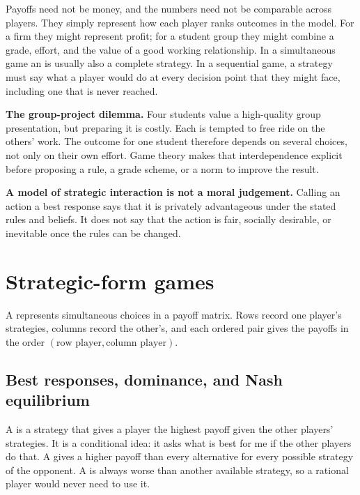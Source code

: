 Payoffs need not be money, and the numbers need not be comparable across
players. They simply represent how each player ranks outcomes in the model.
For a firm they might represent profit; for a student group they might combine
a grade, effort, and the value of a good working relationship.
In a simultaneous game an  is usually also a complete strategy.
In a sequential game, a strategy must say what a player would do at every
decision point that they might face, including one that is never reached.

\begin{exercisebox}
\textbf{The group-project dilemma.}
Four students value a high-quality group presentation, but preparing it is
costly. Each is tempted to free ride on the others' work. The outcome for one
student therefore depends on several choices, not only on their own effort.
Game theory makes that interdependence explicit before proposing a rule, a
grade scheme, or a norm to improve the result.
\end{exercisebox}

\begin{keyidea}
\textbf{A model of strategic interaction is not a moral judgement.}
Calling an action a best response says that it is privately advantageous under
the stated rules and beliefs. It does not say that the action is fair, socially
desirable, or inevitable once the rules can be changed.
\end{keyidea}

\section{Strategic-form games}

A  represents simultaneous choices in a payoff
matrix. Rows record one player's strategies, columns record the other's, and
each ordered pair gives the payoffs in the order \((\text{row player},
\text{column player})\).

\subsection{Best responses, dominance, and Nash equilibrium}

A  is a strategy that gives a player the highest payoff
given the other players' strategies. It is a conditional idea: it asks what is
best for me if the other players do that. A 
gives a higher payoff than every alternative for every possible strategy of the
opponent. A  is always worse than another
available strategy, so a rational player would never need to use it.

